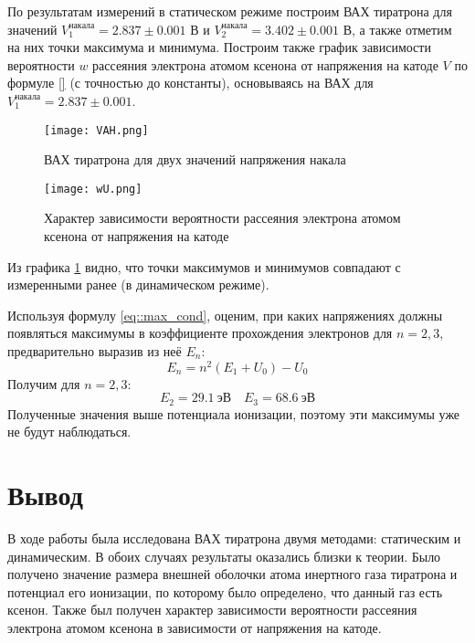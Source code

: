 По результатам измерений в статическом режиме построим ВАХ тиратрона для
значений $V_1^{накала} = 2.837 \pm 0.001$ В и $V_2^{накала} = 3.402 \pm 0.001$
В, а также отметим на них точки максимума и минимума. Построим также график
зависимости вероятности $w$ рассеяния электрона атомом ксенона от напряжения на
катоде $V$ по формуле \eqref{} (с точностью до константы), основываясь на ВАХ для $V_1^{накала} =
2.837 \pm 0.001$.
\newpage
\begin{figure}[h!]
  \centering
  \texttt{[image: VAH.png]}
  \caption{ВАХ тиратрона для двух значений напряжения накала}
  \label{img::VAH}
\end{figure}
\begin{figure}[h!]
  \centering
  \texttt{[image: wU.png]}
  \caption{Характер зависимости вероятности рассеяния электрона атомом ксенона от напряжения на катоде}
\end{figure}

Из графика \ref{img::VAH} видно, что точки максимумов и минимумов совпадают с
измеренными ранее (в динамическом режиме).

Используя формулу \eqref{eq::max_cond}, оценим, при каких напряжениях должны
появляться максимумы в коэффициенте прохождения электронов для $n = 2, 3$,
предварительно выразив из неё $E_n$:
\[
  E_n = n^2 \left(E_1 + U_0\right) - U_0
\]
Получим для $n = 2, 3$:
\[
  E_2 = 29.1 \: \text{эВ} \quad
  E_3 = 68.6 \: \text{эВ}
\]
Полученные значения выше потенциала ионизации, поэтому эти максимумы уже не
будут наблюдаться.

\section{Вывод}

В ходе работы была исследована ВАХ тиратрона двумя методами: статическим и
динамическим. В обоих случаях результаты оказались близки к теории. Было
получено значение размера внешней оболочки атома инертного газа тиратрона и
потенциал его ионизации, по которому было определено, что данный газ есть
ксенон. Также был получен характер зависимости вероятности рассеяния электрона
атомом ксенона  в зависимости от напряжения на катоде.